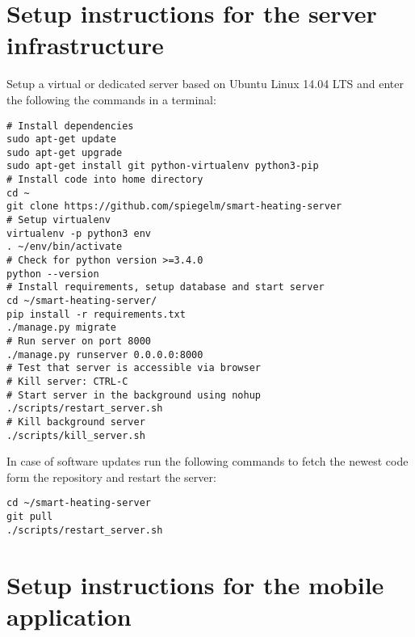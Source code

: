\section{Setup instructions for the server infrastructure}

Setup a virtual or dedicated server based on Ubuntu Linux 14.04 LTS and enter the following the commands in a terminal:

\noindent
\begin{minipage}{\linewidth}
	\begin{lstlisting}
# Install dependencies
sudo apt-get update
sudo apt-get upgrade
sudo apt-get install git python-virtualenv python3-pip
# Install code into home directory
cd ~
git clone https://github.com/spiegelm/smart-heating-server
# Setup virtualenv
virtualenv -p python3 env
. ~/env/bin/activate
# Check for python version >=3.4.0
python --version
# Install requirements, setup database and start server
cd ~/smart-heating-server/
pip install -r requirements.txt
./manage.py migrate
# Run server on port 8000
./manage.py runserver 0.0.0.0:8000
# Test that server is accessible via browser
# Kill server: CTRL-C
# Start server in the background using nohup
./scripts/restart_server.sh
# Kill background server
./scripts/kill_server.sh
	\end{lstlisting}
\end{minipage}

In case of software updates run the following commands to fetch the newest code form the repository and restart the server:

\noindent
\begin{minipage}{\linewidth}
	\begin{lstlisting}
cd ~/smart-heating-server
git pull
./scripts/restart_server.sh
	\end{lstlisting}
\end{minipage}



\section{Setup instructions for the mobile application}










